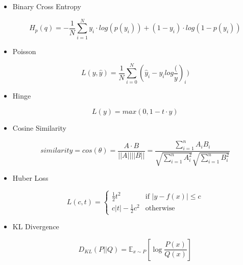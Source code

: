 \documentclass{article}
\begin{document}
    \begin{itemize}
        \item Binary Cross Entropy

        \begin{equation}
            H_p(q)=-\frac{1}{N} \sum_{i=1}^{N} y_i \cdot log(p(y_i)) + (1 - y_i) \cdot log(1 - p(y_i))
        \end{equation}

        \item Poisson

        \begin{equation}
            L(y, \hat{y}) = \frac{1}{N} \sum_{i = 0}^{N} (\hat{y}_i - y_i log \frac(y)_i)
        \end{equation}

        \item Hinge

        \begin{equation}
            L(y) = max(0, 1 - t \cdot y)
        \end{equation}

        \item Cosine Similarity

        \begin{equation}
            similarity = cos(\theta) = \frac{A \cdot B}{||A|| ||B||} = \frac{\sum_{i=1}^{n} A_i B_i}{\sqrt{\sum_ {i = 1}^{n} A_i^2} \sqrt{\sum_ {i = 1}^{n} B_i^2}}
        \end{equation}

        \item Huber Loss

        \begin{equation}
            L(c, t) =
            \begin{cases}
                \frac{1}{2} t^2 & \text{if } |y - f(x)| \leq c \\
                c |t| - \frac{1}{2} c^2 & \text{otherwise}
            \end{cases}
        \end{equation}

        \item KL Divergence

        \begin{equation}
            D_{KL}(P||Q) = \mathbb{E}_{x \sim P}[\log\frac{P(x)}{Q(x)}]
        \end{equation}

    \end{itemize}
\end{document}
